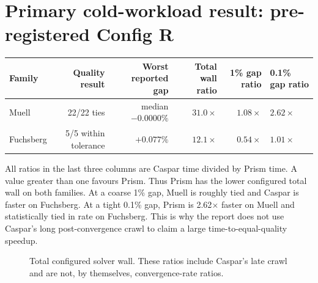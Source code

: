 \documentclass[10pt]{article}
\begin{document}
\section{Primary cold-workload result: pre-registered Config R}

\begin{center}
\begin{tabularx}{0.98\linewidth}{lrrrrY}
\toprule
Family & Quality result & Worst reported gap & Total wall ratio & 1\% gap ratio & 0.1\% gap ratio \\
\midrule
Muell & 22/22 ties & median $-0.0000\%$ & $31.0\times$ & $1.08\times$ & $2.62\times$ \\
Fuchsberg & 5/5 within tolerance & $+0.077\%$ & $12.1\times$ & $0.54\times$ & $1.01\times$ \\
\bottomrule
\end{tabularx}
\end{center}

All ratios in the last three columns are Caspar time divided by Prism time.  A value greater than one favours Prism.  Thus Prism has the lower configured total wall on both families.  At a coarse 1\% gap, Muell is roughly tied and Caspar is faster on Fuchsberg.  At a tight 0.1\% gap, Prism is 2.62$\times$ faster on Muell and statistically tied in rate on Fuchsberg.  This is why the report does not use Caspar's long post-convergence crawl to claim a large time-to-equal-quality speedup.

\begin{figure}[h]
\centering
{}
\caption{Total configured solver wall.  These ratios include Caspar's late crawl and are not, by themselves, convergence-rate ratios.}
\end{figure}
\end{document}

